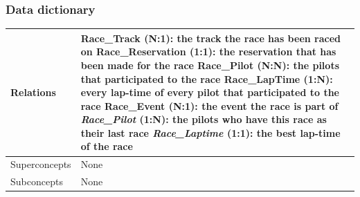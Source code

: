 \documentclass{beamer}
\begin{document}
\begin{frame}
\frametitle{Data dictionary}
\begin{table}
\tiny
\begin{tabular}{|p{2cm}|p{6cm}|}
\hline
Relations & 
Race\_Track (N:1): the track the race has been raced on \newline
Race\_Reservation (1:1): the reservation that has been made for the race \newline
Race\_Pilot (N:N): the pilots that participated to the race \newline
Race\_LapTime (1:N): every lap-time of every pilot that participated to the race \newline
Race\_Event (N:1): the event the race is part of \newline
\textit{Race\_Pilot} (1:N): the pilots who have this race as their last race \newline
\textit{Race\_Laptime} (1:1): the best lap-time of the race \\
\hline
Superconcepts & None \\
\hline
Subconcepts & None \\
\hline
\end{tabular}
\end{table}
\end{frame}
\end{document}
